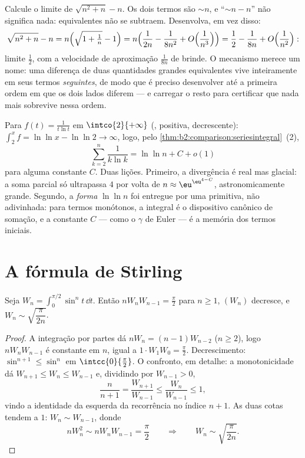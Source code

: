\begin{example}\label{ex:b2:comparison:cancellation}
Calcule o limite de $\sqrt{n^2 + n} - n$. Os dois termos são
$\sim n$, e ``$\sim n - n$'' não significa nada: equivalentes
não se subtraem. Desenvolva, em vez disso:
\[
\sqrt{n^2 + n} - n
= n\Bigl(\sqrt{1 + \tfrac1n} - 1\Bigr)
= n\Bigl(\frac{1}{2n} - \frac{1}{8n^2} +
O\Bigl(\frac1{n^3}\Bigr)\Bigr)
= \frac12 - \frac{1}{8n} + O\Bigl(\frac1{n^2}\Bigr) :
\]
limite $\frac12$, com a velocidade de aproximação $\frac1{8n}$ de
brinde. O mecanismo merece um nome: uma diferença de duas quantidades grandes
equivalentes vive inteiramente em seus termos \emph{seguintes},
de modo que é preciso desenvolver até a primeira ordem em que os dois
lados diferem --- e carregar o resto para certificar que
nada mais sobrevive nessa ordem.
\end{example}

\begin{example}\label{ex:b2:comparison:loglog}
Para $f(t) = \frac{1}{t\ln t}$ em $\intco{2}{+\infty}$
(, positiva, decrescente): $\int_2^x f = \ln\ln x -
\ln\ln 2 \to \infty$, logo, pelo
\cref{thm:b2:comparison:seriesintegral}~(2),
\[
\sum_{k=2}^{n}\frac{1}{k\ln k} = \ln\ln n + C + o(1)
\]
para alguma constante $C$. Duas lições. Primeiro, a divergência é
real mas glacial: a soma parcial só ultrapassa $4$ por volta de $n
\approx \eu^{\eu^{4 - C}}$, astronomicamente grande. Segundo, a
\emph{forma} $\ln\ln n$ foi entregue por uma primitiva, não
adivinhada: para termos monótonos, a integral é o dispositivo canônico de
somação, e a constante $C$ --- como o $\gamma$ de Euler
--- é a memória dos termos iniciais.
\end{example}

\section{A fórmula de Stirling}

\begin{lemma}\label{lem:b2:comparison:wallis}
Seja $W_n = \int_0^{\pi/2} \sin^n t\,\dd t$. Então $nW_nW_{n-1} =
\frac\pi2$ para $n \geq 1$, $(W_n)$ decresce, e $W_n \sim
\sqrt{\dfrac{\pi}{2n}}$.
\end{lemma}

\begin{proof}
A integração por partes dá $nW_n = (n-1)W_{n-2}$ ($n \geq 2$), logo
$nW_nW_{n-1}$ é constante em $n$, igual a $1 \cdot W_1 W_0 =
\frac\pi2$. Decrescimento: $\sin^{n+1} \leq \sin^n$ em
$\intcc{0}{\frac\pi2}$. O confronto, em detalhe: a monotonicidade
dá $W_{n+1} \leq W_n \leq W_{n-1}$ e, dividindo por $W_{n-1}
> 0$,
\[
\frac{n}{n+1} = \frac{W_{n+1}}{W_{n-1}} \leq
\frac{W_n}{W_{n-1}} \leq 1 ,
\]
vindo a identidade da esquerda da recorrência no índice $n + 1$. As duas
cotas tendem a $1$: $W_n \sim W_{n-1}$, donde
\[
nW_n^2 \sim nW_nW_{n-1} = \frac\pi2
\qquad\Longrightarrow\qquad
W_n \sim \sqrt{\frac{\pi}{2n}} .
\]
\end{proof}

